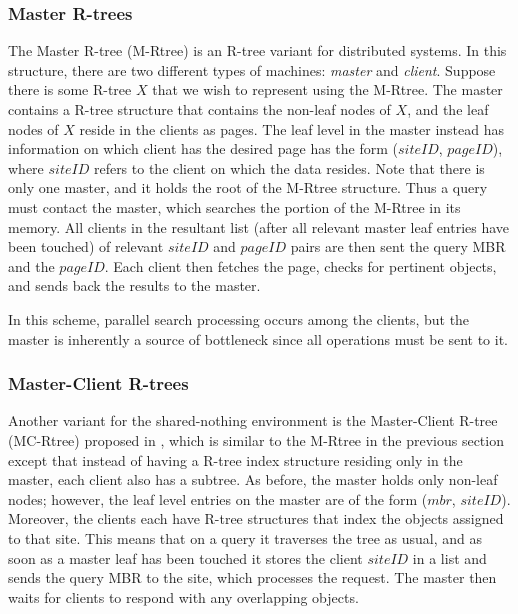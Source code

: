 \subsubsection{Master R-trees}
The Master R-tree (M-Rtree)\cite{koudas1996declustering} is an R-tree variant 
for distributed systems.
In this structure, there are two different types of machines: \emph{master} and 
\emph{client}. Suppose there is some R-tree $X$ that we wish to represent using 
the M-Rtree. The master contains a R-tree structure that contains the non-leaf 
nodes of $X$, and the leaf nodes of $X$ reside in the clients as pages. The leaf 
level in the master instead has information on which client has the desired page has the form ($siteID$, $pageID$), where $siteID$ refers to the client on which
the data resides. Note that there is only one master, and it holds the root of 
the M-Rtree structure.
Thus a query must contact the master, which searches the portion of the M-Rtree 
in its memory. All clients in the resultant list (after all relevant master leaf 
entries have been touched) of relevant $siteID$ and $pageID$ pairs are then sent 
the query MBR and the $pageID$. Each client then fetches the page, checks for 
pertinent objects, and sends back the results to the master. 

In this scheme, parallel search processing occurs among the clients, but the 
master is inherently a source of bottleneck since all operations must be sent to
it.

\subsubsection{Master-Client R-trees}
Another variant for the shared-nothing environment is the Master-Client R-tree 
(MC-Rtree) proposed in \cite{schnitzer1999master},  which is similar to the 
M-Rtree in the previous section except that instead of having a R-tree index 
structure residing only in the master, each client also has a subtree. As before,
the master holds only non-leaf nodes; however, the leaf level entries on the 
master are of the form ($mbr$, $siteID$). Moreover, the clients each have R-tree
structures that index the objects assigned to that site. This means that on a 
query it traverses the tree as usual, and as soon as a master leaf has been 
touched it stores the client $siteID$ in a list and sends the query MBR to the 
site, which processes the request. The master then waits for clients to respond
with any overlapping objects. 

